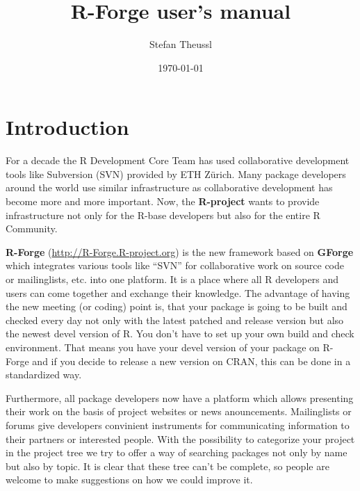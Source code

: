 \documentclass[a4paper]{article}
\title{R-Forge user's manual}
\author{Stefan Theussl}
\date{\today}
\begin{document}
\maketitle


\section{Introduction}
\label{sec:intro}
For a decade the R Development Core Team has used collaborative
development tools like Subversion (SVN) provided by ETH Z\"urich. 
Many package
developers around the world use similar infrastructure as
collaborative development has become more and more important.
Now, the \textbf{R-project} wants to provide infrastructure not only
for the R-base developers but also for the entire R Community.

\textbf{R-Forge} (\url{http://R-Forge.R-project.org}) is the new
framework based on 
\textbf{GForge} which integrates various tools like
``SVN'' for collaborative work on source code or mailinglists,
etc. into one platform. It is a
place where all R developers and users can come together and exchange
their knowledge. The advantage of having the new meeting (or coding)
point is, that your package is going to be built and checked every day
not only with the latest patched and release version but also the
newest devel version of R. You don't have to set up your own
build and check environment. That means you have your devel version of
your package on R-Forge and if you decide to release a new
version on CRAN, this can be done in a standardized way.

Furthermore, all package developers now have a
platform which allows presenting their work on the basis of project
websites or
news anouncements. Mailinglists or forums give developers convinient
instruments for communicating information to their partners or
interested people.
With the possibility to categorize your project in the project tree we
try to offer a way of searching packages not only by name but also by
topic. It is clear that these tree can't be complete, so people are
welcome to make suggestions on how we could improve it.
 
\end{document}

